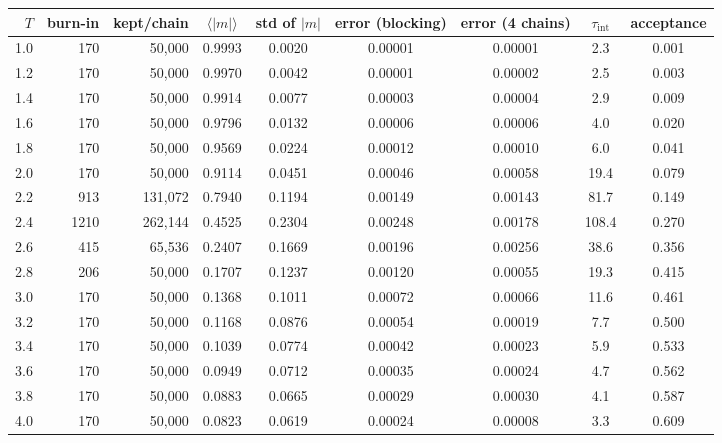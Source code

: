 \documentclass[11pt]{article}
\numberwithin{equation}{section}
\begin{document}
\begin{center}
\small
\begin{tabular}{rrrcccccc}
\toprule
$T$ & burn-in & kept/chain & $\langle|m|\rangle$ & std of $|m|$ & error (blocking) & error (4 chains) & $\tau_\text{int}$ & acceptance \\
\midrule
1.0 & 170 & 50{,}000 & 0.9993 & 0.0020 & 0.00001 & 0.00001 & 2.3 & 0.001 \\
1.2 & 170 & 50{,}000 & 0.9970 & 0.0042 & 0.00001 & 0.00002 & 2.5 & 0.003 \\
1.4 & 170 & 50{,}000 & 0.9914 & 0.0077 & 0.00003 & 0.00004 & 2.9 & 0.009 \\
1.6 & 170 & 50{,}000 & 0.9796 & 0.0132 & 0.00006 & 0.00006 & 4.0 & 0.020 \\
1.8 & 170 & 50{,}000 & 0.9569 & 0.0224 & 0.00012 & 0.00010 & 6.0 & 0.041 \\
2.0 & 170 & 50{,}000 & 0.9114 & 0.0451 & 0.00046 & 0.00058 & 19.4 & 0.079 \\
2.2 & 913 & 131{,}072 & 0.7940 & 0.1194 & 0.00149 & 0.00143 & 81.7 & 0.149 \\
2.4 & 1210 & 262{,}144 & 0.4525 & 0.2304 & 0.00248 & 0.00178 & 108.4 & 0.270 \\
2.6 & 415 & 65{,}536 & 0.2407 & 0.1669 & 0.00196 & 0.00256 & 38.6 & 0.356 \\
2.8 & 206 & 50{,}000 & 0.1707 & 0.1237 & 0.00120 & 0.00055 & 19.3 & 0.415 \\
3.0 & 170 & 50{,}000 & 0.1368 & 0.1011 & 0.00072 & 0.00066 & 11.6 & 0.461 \\
3.2 & 170 & 50{,}000 & 0.1168 & 0.0876 & 0.00054 & 0.00019 & 7.7 & 0.500 \\
3.4 & 170 & 50{,}000 & 0.1039 & 0.0774 & 0.00042 & 0.00023 & 5.9 & 0.533 \\
3.6 & 170 & 50{,}000 & 0.0949 & 0.0712 & 0.00035 & 0.00024 & 4.7 & 0.562 \\
3.8 & 170 & 50{,}000 & 0.0883 & 0.0665 & 0.00029 & 0.00030 & 4.1 & 0.587 \\
4.0 & 170 & 50{,}000 & 0.0823 & 0.0619 & 0.00024 & 0.00008 & 3.3 & 0.609 \\
\bottomrule
\end{tabular}
\label{tab:1B}
\end{center}
\end{document}
